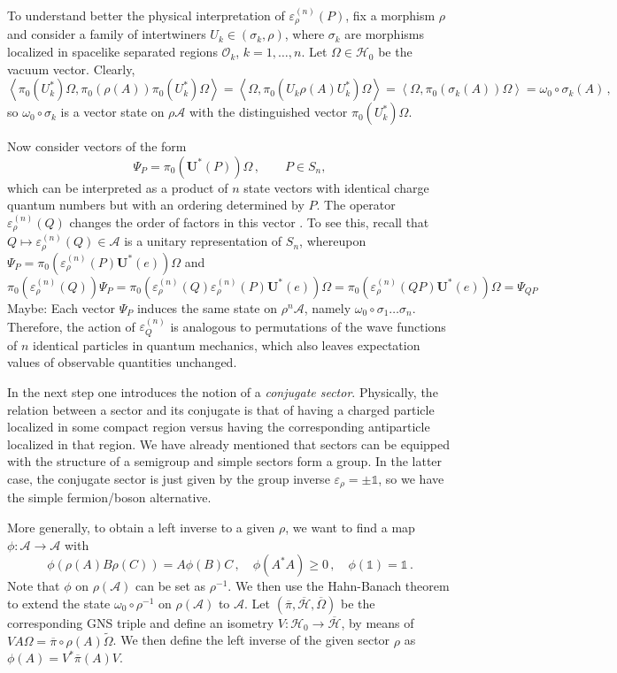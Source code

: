 \documentclass[12pt,a4paper]{article}
\newcommand{\1}{\mathds{1}}                         %
\newcommand{\Hcal}{\mathcal {H}}
\newcommand{\Ocal}{\mathcal{O}}
\newcommand{\Ac}{{\mathcal{A}}}
\begin{document}
To understand better the physical interpretation of $\varepsilon^{(n)}_\rho(P)$, fix a morphism $\rho$ and consider a family of intertwiners $U_k\in(\sigma_k,\rho)$, where $\sigma_k$ are morphisms localized in spacelike separated regions $\Ocal_k$, $k=1,\dots,n$. Let $\Omega\in\Hcal_0$ be 
the vacuum vector. Clearly,
\[
\left<\pi_0(U_k^*)\Omega,\pi_0(\rho(A)) \pi_0(U_k^*)\Omega\right>=\left<\Omega,\pi_0(U_k\rho(A)U_k^*)\Omega\right>=\left<\Omega,\pi_0(\sigma_k(A)) \Omega\right>=\omega_0\circ \sigma_k(A)\,,
\]
so $\omega_0\circ\sigma_k$ is a vector state on $\rho\Ac$ with the distinguished vector $\pi_0(U_k^*)\Omega$.

Now consider vectors of the form
\[
\Psi_P=\pi_0(\boldsymbol{U}^*(P))\Omega\,, \qquad P\in S_n,
\]
which can be interpreted as a product of $n$ state vectors with
identical charge quantum numbers but with an ordering determined by $P$. The operator  $\varepsilon^{(n)}_\rho(Q)$ changes the order of factors in this vector \cite{DHR3}. To see this, recall that
$Q\mapsto \varepsilon^{(n)}_\rho(Q)\in\Ac$ is a unitary representation of $S_n$, whereupon $\Psi_P=\pi_0( \varepsilon^{(n)}_\rho(P)  \boldsymbol{U}^*(e))\Omega$ and
\[\pi_0( \varepsilon^{(n)}_\rho(Q))\Psi_P=\pi_0(\varepsilon^{(n)}_\rho(Q) \varepsilon^{(n)}_\rho(P)\boldsymbol{U}^*(e))\Omega = \pi_0(\varepsilon^{(n)}_\rho(QP)\boldsymbol{U}^*(e))\Omega=\Psi_{QP}
\]
Maybe: Each vector $\Psi_P$ induces the same state on $\rho^n\Ac$, namely $\omega_0\circ \sigma_1\dots\sigma_n$. Therefore, the action of $\varepsilon^{(n)}_Q$ is analogous to permutations of the wave functions of $n$ identical particles in quantum mechanics, which also leaves expectation values of observable quantities unchanged.

In the next step one introduces the notion of a \emph{conjugate sector}. Physically, the relation between a sector and its conjugate is that of having a charged particle localized in some compact region versus having the corresponding antiparticle localized in that region. We have already mentioned that sectors can be equipped with the structure of a semigroup and simple sectors form a group. In the latter case, the conjugate sector is just given by the group inverse $\varepsilon_\rho=\pm \1$, so we have the simple fermion/boson alternative.

More generally, to  obtain a left inverse to a given $\rho$, we want to find a map $\phi:\Ac\rightarrow \Ac$ with
\[
\phi(\rho(A)B\rho(C))=A\phi(B)C\,,\quad \phi(A^*A)\geq0\,,\quad \phi(\1)=\1\,.
\]
Note that $\phi$ on $\rho(\Ac)$ can be set as $\rho^{-1}$. We then use the Hahn-Banach theorem to extend the state $\omega_0\circ \rho^{-1}$ on $\rho(\Ac)$ to $\Ac$. Let $(\overline{\pi},\overline{\Hcal}, \overline{\Omega})$ be the corresponding GNS triple and define an isometry $V:\Hcal_{0}\rightarrow \overline{\Hcal}$, by means of
$VA\Omega=\overline{\pi}\circ \rho(A)\tilde{\Omega}$. We then define the left inverse of the given sector $\rho$ as $\phi(A)=V^* \overline{\pi}(A) V$. 
\end{document}
